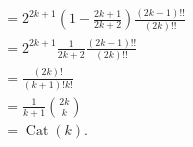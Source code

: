 \documentclass[10pt]{mypackage}
\begin{document}
\begin{solution}
\begin{enumerate}[(i)]
\begin{align*}
                                                            &= 2^{2k+1} \left( 1-\frac{2k+1}{2k+2} \right) \frac{\left( 2k-1 \right)!!}{\left( 2k \right)!!}\\
                                                            &= 2^{2k+1} \frac{1}{2k+2} \frac{\left( 2k-1 \right)!!}{\left( 2k \right)!!}\\
                                                            &= \frac{\left( 2k \right)!}{\left( k+1 \right)!k!}\\
                                                            &= \frac{1}{k+1}{2k\choose k}\\
                                                            &= \operatorname{Cat}(k).
      \end{align*}
  \end{enumerate}
\end{solution}
\pagebreak
\end{document}

